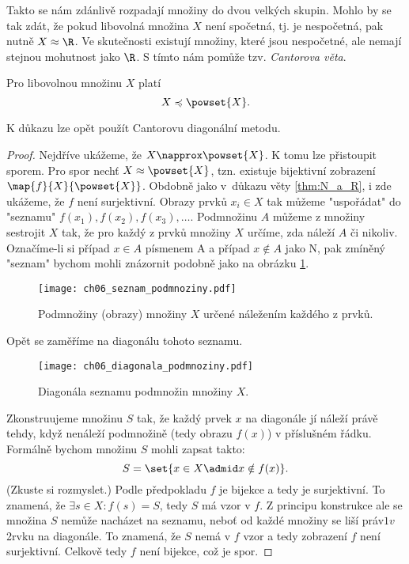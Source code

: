 Takto se nám zdánlivě rozpadají množiny do dvou velkých skupin. Mohlo by se tak zdát, že pokud libovolná množina $X$ není spočetná, tj. je nespočetná, pak nutně $X\approx\R$. Ve skutečnosti existují množiny, které jsou nespočetné, ale nemají stejnou mohutnost jako $\R$. S tímto nám pomůže tzv. \emph{Cantorova věta}.
\begin{theorem}[Cantorova]
    Pro libovolnou množinu $X$ platí
    \begin{equation*}
        X\preccurlyeq\powset{X}.
    \end{equation*}
\end{theorem}
K důkazu lze opět použít Cantorovu diagonální metodu.
\begin{proof}
    Nejdříve ukážeme, že $X\napprox\powset{X}$. K tomu lze přistoupit sporem. Pro spor nechť $X\approx\powset{X}$, tzn. existuje bijektivní zobrazení $\map{f}{X}{\powset{X}}$. Obdobně jako v~důkazu věty \ref{thm:N_a_R}, i zde ukážeme, že $f$ není surjektivní. Obrazy prvků $x_i\in X$ tak můžeme "uspořádat" do "seznamu" $f(x_1),f(x_2),f(x_3),\dots$. Podmnožinu $A$ můžeme z množiny sestrojit $X$ tak, že pro každý z prvků množiny $X$ určíme, zda náleží $A$ či nikoliv. Označíme-li si případ $x\in A$ písmenem A a případ $x\notin A$ jako N, pak zmíněný "seznam" bychom mohli znázornit podobně jako na obrázku \ref{fig:seznam_podmnoziny}.
    \begin{figure}[H]
        \centering
        \texttt{[image: ch06\_seznam\_podmnoziny.pdf]}
        \caption{Podmnožiny (obrazy) množiny $X$ určené náležením každého z prvků.}
        \label{fig:seznam_podmnoziny}
    \end{figure}
    Opět se zaměříme na diagonálu tohoto seznamu.
    \begin{figure}[H]
        \centering
        \texttt{[image: ch06\_diagonala\_podmnoziny.pdf]}
        \caption{Diagonála seznamu podmnožin množiny $X$.}
        \label{fig:diagonala_podmnoziny}
    \end{figure}
    Zkonstruujeme množinu $S$ tak, že každý prvek $x$ na diagonále jí náleží právě tehdy, když nenáleží podmnožině (tedy obrazu $f(x)$) v příslušném řádku. Formálně bychom množinu $S$ mohli zapsat takto:
    \begin{equation*}
        S=\set{x\in X \admid x\notin f(x)}.
    \end{equation*}
    (Zkuste si rozmyslet.) Podle předpokladu $f$ je bijekce a tedy je surjektivní. To znamená, že $\exists s\in X: f(s)=S$, tedy $S$ má vzor v $f$. Z principu konstrukce ale se množina $S$ nemůže nacházet na seznamu, neboť od každé množiny se liší práv$1 v~$2rvku na diagonále. To znamená, že $S$ nemá v $f$ vzor a tedy zobrazení $f$ není surjektivní. Celkově tedy $f$ není bijekce, což je spor.\par

\end{proof}
